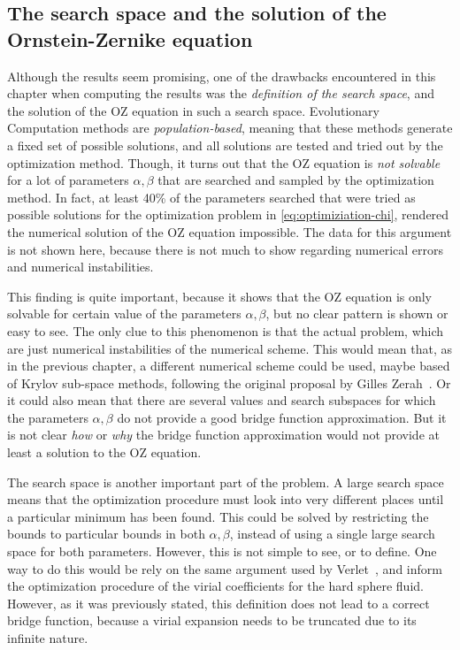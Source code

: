 \subsection{The search space and the solution of the Ornstein-Zernike equation}
Although the results seem promising, one of the drawbacks encountered in this chapter when 
computing the results was the \emph{definition of the search space}, and the solution of 
the OZ equation in such a search space. Evolutionary Computation 
methods are \emph{population-based}, meaning that these methods generate a fixed set of 
possible solutions, and all solutions are tested and tried out by the optimization method. 
Though, it turns out that the OZ equation is \emph{not solvable} for a lot of parameters 
\(\alpha, \beta\) that are searched and sampled by the optimization method. In fact, at 
least 40\% of the parameters searched that were tried as possible solutions for the 
optimization problem in \autoref{eq:optimiziation-chi}, rendered the numerical solution of 
the OZ equation impossible. The data for this argument is not shown here, because there is 
not much to show regarding numerical errors and numerical instabilities.

This finding is quite important, because it shows that the OZ equation is only solvable for 
certain value of the parameters \(\alpha, \beta\), but no clear pattern is shown or easy to 
see. The only clue to this phenomenon is that the actual problem, which are just numerical 
instabilities of the numerical scheme. This would mean that, as in the previous chapter, a 
different numerical scheme could be used, maybe based of Krylov sub-space methods, 
following the original proposal by Gilles Zerah~\cite{zerahEfficientNewtonMethod1985}. Or 
it could also mean that there are several values and search subspaces for which the 
parameters \(\alpha, \beta\) do not provide a good bridge function approximation. But it is 
not clear \emph{how} or \emph{why} the bridge function approximation would not provide at 
least a solution to the OZ equation.

The search space is another important part of the problem. A large search space means that 
the optimization procedure must look into very different places until a particular minimum 
has been found. This could be solved by restricting the bounds to particular bounds in both 
\(\alpha, \beta\), instead of using a single large search space for both parameters. 
However, this is not simple to see, or to define. One way to do this would be rely on the 
same argument used by Verlet~\cite{verletIntegralEquationsClassical1980}, and inform the 
optimization procedure of the virial coefficients for the hard sphere fluid.
However, as it was previously stated, this definition does not lead to a correct bridge 
function, because a virial expansion needs to be truncated due to its infinite nature.

